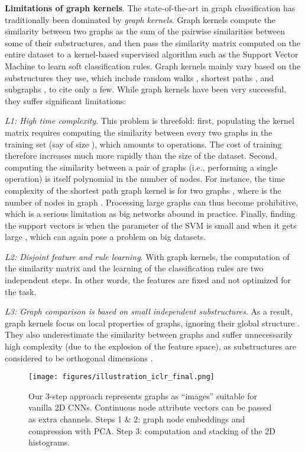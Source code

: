 \documentclass[runningheads]{llncs}
\begin{document}
\noindent \textbf{Limitations of graph kernels}.
The state-of-the-art in graph classification has traditionally been dominated by \textit{graph kernels}. Graph kernels compute the similarity between two graphs as the sum of the pairwise similarities between some of their substructures, and then pass the similarity matrix computed on the entire dataset to a kernel-based supervised algorithm such as the Support Vector Machine \cite{cortes1995support} to learn soft classification rules. Graph kernels mainly vary based on the substructures they use, which include random walks \cite{gartner2003graph}, shortest paths \cite{borgwardt2005shortest}, and subgraphs \cite{shervashidze2009efficient}, to cite only a few. While graph kernels have been very successful, they suffer significant limitations:

\textit{L1: High time complexity}. This problem is threefold: first, populating the kernel matrix requires computing the similarity between every two graphs in the training set (say of size ), which amounts to  operations. The cost of training therefore increases much more rapidly than the size of the dataset. Second, computing the similarity between a pair of graphs (i.e., performing a single operation) is itself polynomial in the number of nodes. For instance, the time complexity of the shortest path graph kernel is  for two graphs , where  is the number of nodes in graph . Processing large graphs can thus become prohibitive, which is a serious limitation as big networks abound in practice. Finally, finding the support vectors is  when the  parameter of the SVM is small and  when it gets large \cite{bottou2007support}, which can again pose a problem on big datasets.

\textit{L2: Disjoint feature and rule learning}. With graph kernels, the computation of the similarity matrix and the learning of the classification rules are two independent steps. In other words, the features are fixed and not optimized for the task.

\textit{L3: Graph comparison is based on small independent substructures}. As a result, graph kernels focus on local properties of graphs, ignoring their global structure \cite{nikolentzos2017matching}. They also underestimate the similarity between graphs and suffer unnecessarily high complexity (due to the explosion of the feature space), as substructures are considered to be orthogonal dimensions \cite{yanardag2015deep}.

\begin{figure*}[h]
  \centering
    \texttt{[image: figures/illustration\_iclr\_final.png]}
\captionsetup{justification=justified,size=small}
    \caption{Our 3-step approach represents graphs as ``images'' suitable for vanilla 2D CNNs. Continuous node attribute vectors can be passed as extra channels. Steps 1 \& 2: graph node embeddings and compression with PCA. Step 3: computation and stacking of the 2D histograms.}
\label{fig:overview}
\end{figure*}
\end{document}
